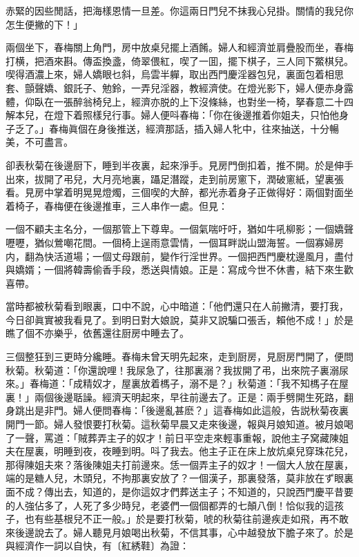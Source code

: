 \begin{myquote}
赤緊的因些閒話，把海樣恩情一旦差。你這兩日門兒不抹我心兒掛。關情的我兒你怎生便撇的下！」
\end{myquote}

兩個坐下，春梅關上角門，房中放桌兒擺上酒餚。婦人和經濟並肩疊股而坐，春梅打横，把酒來斟。傳盃換盞，倚翠偎紅，喫了一囬，擺下棋子，三人同下鱉棋兒。喫得酒濃上來，婦人嬌眼乜斜，烏雲半軃，取出西門慶淫器包兒，裏面包着相思套、顫聲嬌、銀託子、勉鈴，一弄兒淫器，教經濟使。在燈光影下，婦人便赤身露體，仰臥在一張醉翁椅兒上，經濟亦脱的上下沒條絲，也對坐一椅，拏春意二十四解本兒，在燈下着照樣兒行事。婦人便呌春梅：「你在後邊推着你姐夫，只怕他身子乏了。」春梅眞個在身後推送，經濟那話，插入婦人牝中，往來抽送，十分暢美，不可盡言。

卻表秋菊在後邊厨下，睡到半夜裏，起來淨手。見房門倒扣着，推不開。於是伸手出來，拔開了弔兒，大月亮地裏，躡足潛蹤，走到前房窻下，潤破窻紙，望裏張看。見房中掌着明晃晃燈燭，三個喫的大醉，都光赤着身子正做得好：兩個對面坐着椅子，春梅便在後邊推車，三人串作一處。但見：

\begin{myquote}
一個不顧夫主名分，一個那管上下尊卑。一個氣喘吁吁，猶如牛吼柳影；一個嬌聲嚦嚦，猶似鶯嘲花間。一個椅上逞雨意雲情，一個耳畔説山盟海誓。一個寡婦房内，翻為快活道場；一個丈母跟前，變作行淫世界。一個把西門慶枕邊風月，盡付與嬌婿；一個將韓壽偷香手段，悉送與情娘。正是：寫成今世不休書，結下來生歡喜帶。
\end{myquote}

當時都被秋菊看到眼裏，口中不說，心中暗道：「他們還只在人前撇清，要打我，今日卻眞實被我看見了。到明日對大娘說，莫非又說騙口張舌，賴他不成！」於是瞧了個不亦樂乎，依舊還往厨房中睡去了。

三個整狂到三更時分纔睡。春梅未曾天明先起來，走到厨房，見厨房門開了，便問秋菊。秋菊道：「你還說哩！我尿急了，往那裏溺？我拔開了弔，出來院子裏溺尿來。」春梅道：「成精奴才，屋裏放着榪子，溺不是？」秋菊道：「我不知榪子在屋裏！」兩個後邊聒譟。經濟天明起來，早往前邊去了。正是：兩手劈開生死路，翻身跳出是非門。婦人便問春梅：「後邊亂甚麽？」這春梅如此這般，告説秋菊夜裏開門一節。婦人發恨要打秋菊。這秋菊早晨又走來後邊，報與月娘知道。被月娘喝了一聲，罵道：「賊葬弄主子的奴才！前日平空走來輕事重報，說他主子窝藏陳姐夫在屋裏，明睡到夜，夜睡到明。呌了我去。他主子正在床上放炕桌兒穿珠花兒，那得陳姐夫來？落後陳姐夫打前邊來。恁一個弄主子的奴才！一個大人放在屋裏，端的是糖人兒，木頭兒，不拘那裏安放了？一個漢子，那裏發落，莫非放在ず眼裏面不成？傳出去，知道的，是你這奴才們葬送主子；不知道的，只說西門慶平昔要的人強佔多了，人死了多少時兒，老婆們一個個都弄的七顛八倒！恰似我的這孩子，也有些基根兒不正一般。」於是要打秋菊，唬的秋菊往前邊疾走如飛，再不敢來後邊說去了。婦人聽見月娘喝出秋菊，不信其事，心中越發放下膽子來了。於是與經濟作一詞以自快，有〔紅綉鞋〕為證：


